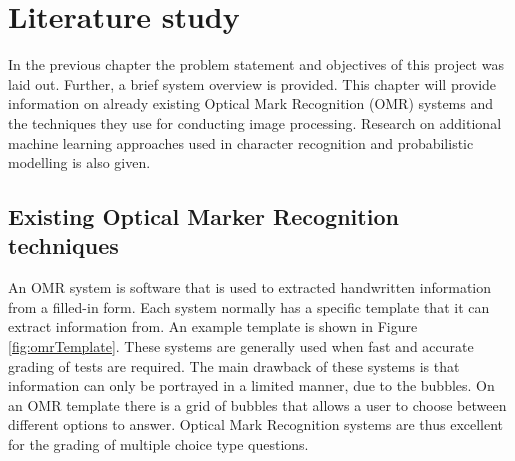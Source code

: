 \chapter{Literature study}
\label{ch:LiteratureStudy}
\graphicspath{{Chapter2/Chapter2Figures/}}
In the previous chapter the problem statement and objectives of this project was laid out. Further, a brief system overview is provided.
This chapter will provide information on already existing Optical Mark Recognition (OMR) systems and the techniques they use for conducting image processing. Research on additional machine learning approaches used in character recognition and probabilistic modelling is also given.

\section{Existing Optical Marker Recognition techniques}
An OMR system is software that is used to extracted handwritten information from a filled-in form. Each system normally has a specific template that it can extract information from. An example template is shown in Figure \ref{fig:omrTemplate}. These systems are generally used when fast and accurate grading of tests are required. The main drawback of these systems is that information can only be portrayed in a limited manner, due to the bubbles. On an OMR template there is a grid of bubbles that allows a user to choose between different options to answer. Optical Mark Recognition systems are thus excellent for the grading of multiple choice type questions. 

